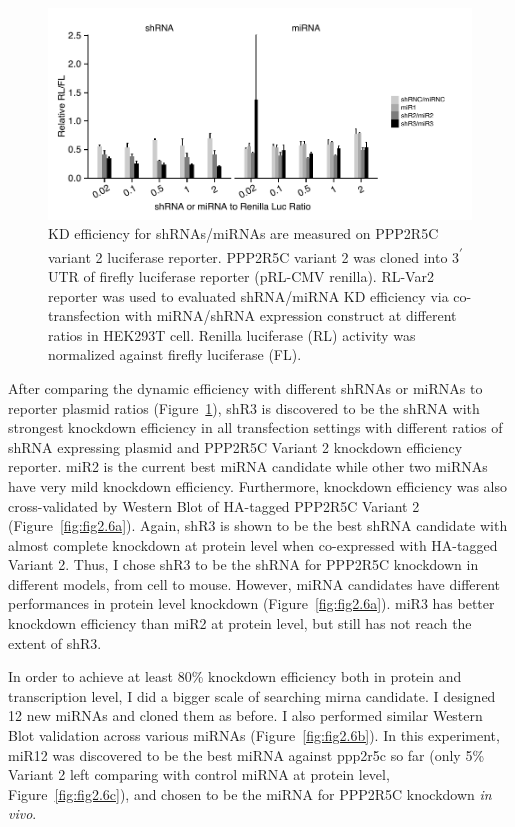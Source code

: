 \begin{figure}[htbp]
\centering
\includegraphics[width=1\textwidth]{figs/fig2-5 shR miR kd luc.pdf}
\caption[shRNA/miRNA KD efficiency on PPP2R5C luciferase reporter]{\footnotesize KD efficiency for shRNAs/miRNAs are measured on PPP2R5C variant 2 luciferase reporter. PPP2R5C variant 2 was cloned into 3\textsuperscript{$\prime$} UTR of firefly luciferase reporter (pRL-CMV renilla). RL-Var2 reporter was used to evaluated shRNA/miRNA KD efficiency via co-transfection with miRNA/shRNA expression construct at different ratios in HEK293T cell. Renilla luciferase (RL) activity was normalized against firefly luciferase (FL).}
\label{fig:fig2.5}
\end{figure}

After comparing the dynamic efficiency with different shRNAs or miRNAs to reporter plasmid ratios (Figure~\ref{fig:fig2.5}), shR3 is discovered to be the shRNA with strongest knockdown efficiency in all transfection settings with different ratios of shRNA expressing plasmid and PPP2R5C Variant 2 knockdown efficiency reporter. miR2 is the current best miRNA candidate while other two miRNAs have very mild knockdown efficiency. Furthermore, knockdown efficiency was also cross-validated by Western Blot of HA-tagged PPP2R5C Variant 2 (Figure~\ref{fig:fig2.6a}). Again, shR3 is shown to be the best shRNA candidate with almost complete knockdown at protein level when co-expressed with HA-tagged Variant 2. Thus, I chose shR3 to be the shRNA for PPP2R5C knockdown in different models, from cell to mouse. However, miRNA candidates have different performances in protein level knockdown (Figure~\ref{fig:fig2.6a}). miR3 has better knockdown efficiency than miR2 at protein level, but still has not reach the extent of shR3.

In order to achieve at least 80\% knockdown efficiency both in protein and transcription level, I did a bigger scale of searching \gls{mirna} candidate. I designed 12 new miRNAs and cloned them as before. I also performed similar Western Blot validation across various miRNAs (Figure~\ref{fig:fig2.6b}). In this experiment, miR12 was discovered to be the best miRNA against \gls{ppp2r5c} so far (only 5\% Variant 2 left comparing with control miRNA at protein level, Figure~\ref{fig:fig2.6c}), and chosen to be the miRNA for PPP2R5C knockdown \textit{in vivo}. 

